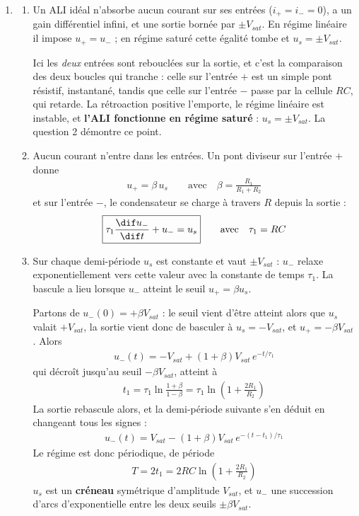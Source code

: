 \begin{correction}

\begin{enumerate}

	\item
	\begin{enumerate}

		\item Un ALI idéal n'absorbe aucun courant sur ses entrées ($i_+=i_-=0$), a un gain différentiel infini, et une sortie bornée par $\pm V_{sat}$. En régime linéaire il impose $u_+=u_-$ ; en régime saturé cette égalité tombe et $u_s=\pm V_{sat}$.

		Ici les \textit{deux} entrées sont rebouclées sur la sortie, et c'est la comparaison des deux boucles qui tranche : celle sur l'entrée $+$ est un simple pont résistif, instantané, tandis que celle sur l'entrée $-$ passe par la cellule $RC$, qui retarde. La rétroaction positive l'emporte, le régime linéaire est instable, et \textbf{l'ALI fonctionne en régime saturé} : $u_s=\pm V_{sat}$. La question 2 démontre ce point.

		\item Aucun courant n'entre dans les entrées. Un pont diviseur sur l'entrée $+$ donne
		\begin{align*}
			u_+=\beta\,u_s \qquad\text{avec}\quad \beta=\frac{R_1}{R_1+R_2}
		\end{align*}
		et sur l'entrée $-$, le condensateur se charge à travers $R$ depuis la sortie :
		\begin{align*}
			\boxed{\tau_1\frac{\dif u_-}{\dif t}+u_-=u_s} \qquad\text{avec}\quad \tau_1=RC
		\end{align*}

		\item Sur chaque demi-période $u_s$ est constante et vaut $\pm V_{sat}$ : $u_-$ relaxe exponentiellement vers cette valeur avec la constante de temps $\tau_1$. La bascule a lieu lorsque $u_-$ atteint le seuil $u_+=\beta u_s$.

		Partons de $u_-(0)=+\beta V_{sat}$ : le seuil vient d'être atteint alors que $u_s$ valait $+V_{sat}$, la sortie vient donc de basculer à $u_s=-V_{sat}$, et $u_+=-\beta V_{sat}$. Alors
		\begin{align*}
			u_-(t)=-V_{sat}+(1+\beta)V_{sat}\,e^{-t/\tau_1}
		\end{align*}
		qui décroît jusqu'au seuil $-\beta V_{sat}$, atteint à
		\begin{align*}
			t_1=\tau_1\ln\frac{1+\beta}{1-\beta}=\tau_1\ln\left(1+\frac{2R_1}{R_2}\right)
		\end{align*}
		La sortie rebascule alors, et la demi-période suivante s'en déduit en changeant tous les signes :
		\begin{align*}
			u_-(t)=V_{sat}-(1+\beta)V_{sat}\,e^{-(t-t_1)/\tau_1}
		\end{align*}
		Le régime est donc périodique, de période
		\begin{align*}
			\boxed{T=2t_1=2RC\ln\left(1+\frac{2R_1}{R_2}\right)}
		\end{align*}
		$u_s$ est un \textbf{créneau} symétrique d'amplitude $V_{sat}$, et $u_-$ une succession d'arcs d'exponentielle entre les deux seuils $\pm\beta V_{sat}$.


\end{enumerate}
\end{enumerate}
\end{correction}
